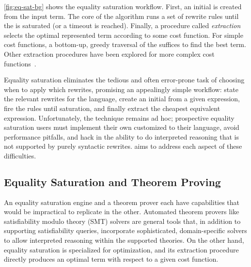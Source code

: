 \autoref{fig:eq-sat-bg} shows the equality saturation workflow.
First, an initial \egraph is created from the input term.
The core of the algorithm runs a set of rewrite rules until the \egraph is
  saturated (or a timeout is reached).
Finally, a procedure called \textit{extraction} selects the optimal represented
  term according to some cost function.
For simple cost functions, a bottom-up, greedy traversal of the \egraph suffices
  to find the best term.
Other extraction procedures have been explored for more complex cost
  functions~\cite{spores, wu_siga19}.

Equality saturation eliminates the tedious and often error-prone
  task of choosing when to apply which rewrites,
  promising an appealingly simple workflow: state the
  relevant rewrites for the language, create an initial \egraph from a given
  expression, fire the rules until saturation,
  and finally extract the cheapest equivalent expression.
Unfortunately, the technique remains ad hoc; prospective equality saturation
  users must implement their own \egraphs customized to their language, avoid
  performance pitfalls, and hack in the ability to do interpreted reasoning
  that is not supported by purely syntactic rewrites.
\egg aims to address each aspect of these difficulties.

\subsection{Equality Saturation and Theorem Proving}

An equality saturation engine and a theorem prover each have capabilities that
  would be impractical to replicate in the other.
Automated theorem provers like satisfiability modulo theory (SMT) solvers are
  general tools that, in addition to supporting satisfiability queries,
  incorporate sophisticated, domain-specific solvers to allow interpreted
  reasoning within the supported theories.
On the other hand, equality saturation is specialized for optimization, and its
  extraction procedure directly produces an optimal term with respect to a given
  cost function.


